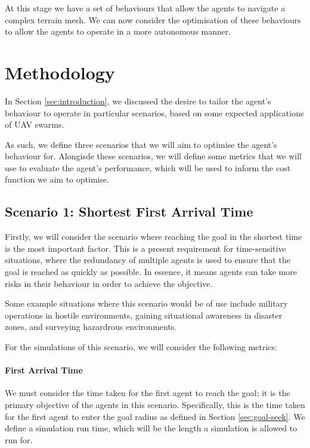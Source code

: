 \documentclass[12pt]{article}
\begin{document}
At this stage we have a set of behaviours that allow the agents to navigate a complex terrain mesh. We can now consider the optimisation of these behaviours to allow the agents to operate in a more autonomous manner.

\section{Methodology}
\label{sec:methodology}

In Section \ref{sec:introduction}, we discussed the desire to tailor the agent's behaviour to operate in particular scenarios, based on some expected applications of UAV swarms.

As such, we define three scenarios that we will aim to optimise the agent's behaviour for. Alongisde these scenarios, we will define some metrics that we will use to evaluate the agent's performance, which will be used to inform the cost function we aim to optimise.

\subsection{Scenario 1: Shortest First Arrival Time}
Firstly, we will consider the scenario where reaching the goal in the shortest time is the most important factor. This is a present requirement for time-sensitive situations, where the redundancy of multiple agents is used to ensure that the goal is reached as quickly as possible. In essence, it means agents can take more risks in their behaviour in order to achieve the objective.

Some example situations where this scenario would be of use include military operations in hostile environments, gaining situational awareness in disaster zones, and surveying hazardrous environments\cite{Srinath}.

For the simulations of this scenario, we will consider the following metrics:

\paragraph{First Arrival Time} 
We must consider the time taken for the first agent to reach the goal; it is the primary objective of the agents in this scenario. Specifically, this is the time taken for the first agent to enter the goal radius as defined in Section \ref{sec:goal-seek}. We define a simulation run time, which will be the length a simulation is allowed to run for.
\end{document}
